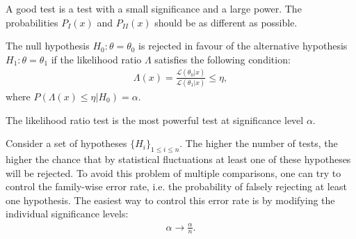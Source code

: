 {    
    \begin{remark}
        A good test is a test with a small significance and a large power. The probabilities $P_I(x)$ and $P_{II}(x)$ should be as different as possible.
    \end{remark}

    \begin{definition}\label{statistics:likelihood_ratio}
        The null hypothesis $H_0:\theta=\theta_0$ is rejected in favour of the alternative hypothesis $H_1:\theta=\theta_1$ if the likelihood ratio $\Lambda$ satisfies the following condition:
        \begin{gather}
            \Lambda(x) = \frac{\mathcal{L}(\theta_0|x)}{\mathcal{L}(\theta_1|x)}\leq\eta,
        \end{gather}
        where $P(\Lambda(x)\leq\eta|H_0) = \alpha $.
    \end{definition}
    \begin{theorem}
        The likelihood ratio test is the most powerful test at significance level $\alpha$.
    \end{theorem}

    \begin{construct}
        Consider a set of hypotheses $\{H_i\}_{1\leq i\leq n}$. The higher the number of tests, the higher the chance that by statistical fluctuations at least one of these hypotheses will be rejected. To avoid this problem of multiple comparisons, one can try to control the family-wise error rate, i.e. the probability of falsely rejecting at least one hypothesis. The easiest way to control this error rate is by modifying the individual significance levels:
        \begin{gather}
            \alpha\longrightarrow\frac{\alpha}{n}.
        \end{gather}
    \end{construct}

}
